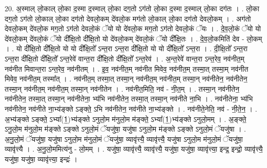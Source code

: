 \documentclass[17pt]{extarticle}
\begin{document}
20. अ॒स्माल् लो॒काल् लो॒का द॒स्मा द॒स्माल् लो॒का दग॒तो ऽग॑तो लो॒का द॒स्मा द॒स्माल् लो॒का दग॑तः । . लो॒का दग॒तो ऽग॑तो लो॒काल् लो॒का दग॑तो देवलो॒कम् दे॑वलो॒क मग॑तो लो॒काल् लो॒का दग॑तो देवलो॒कम् । . अग॑तो देवलो॒कम् दे॑वलो॒क मग॒तो ऽग॑तो देवलो॒कं ॅयो यो दे॑वलो॒क मग॒तो ऽग॑तो देवलो॒कं ॅयः । . दे॒व॒लो॒कं ॅयो यो दे॑वलो॒कम् दे॑वलो॒कं ॅयो दी᳚क्षि॒तो दी᳚क्षि॒तो यो दे॑वलो॒कम् दे॑वलो॒कं ॅयो दी᳚क्षि॒तः । . दे॒व॒लो॒कमिति॑ देव - लो॒कम् । . यो दी᳚क्षि॒तो दी᳚क्षि॒तो यो यो दी᳚क्षि॒तो᳚ ऽन्त॒रा ऽन्त॒रा दी᳚क्षि॒तो यो यो दी᳚क्षि॒तो᳚ ऽन्त॒रा । . दी॒क्षि॒तो᳚ ऽन्त॒रा ऽन्त॒रा दी᳚क्षि॒तो दी᳚क्षि॒तो᳚ ऽन्त॒रेवे॑ वान्त॒रा दी᳚क्षि॒तो दी᳚क्षि॒तो᳚ ऽन्त॒रेव॑ । . अ॒न्त॒रेवे॑ वान्त॒रा ऽन्त॒रेव॒ नव॑नीत॒म् नव॑नीत मिवान्त॒रा ऽन्त॒रेव॒ नव॑नीतम् । . इ॒व॒ नव॑नीत॒म् नव॑नीत मिवेव॒ नव॑नीत॒म् तस्मा॒त् तस्मा॒म् नव॑नीत मिवेव॒ नव॑नीत॒म् तस्मा᳚त् । . नव॑नीत॒म् तस्मा॒त् तस्मा॒न् नव॑नीत॒म् नव॑नीत॒म् तस्मा॒न् नव॑नीतेन॒ नव॑नीतेन॒ तस्मा॒न् नव॑नीत॒म् नव॑नीत॒म् तस्मा॒न् नव॑नीतेन । . नव॑नीत॒मिति॒ नव॑ - नी॒त॒म् । . तस्मा॒न् नव॑नीतेन॒ नव॑नीतेन॒ तस्मा॒त् तस्मा॒न् नव॑नीतेना॒ भ्य॑भि नव॑नीतेन॒ तस्मा॒त् तस्मा॒न् नव॑नीते ना॒भि । . नव॑नीतेना॒ भ्य॑भि नव॑नीतेन॒ नव॑नीते ना॒भ्य॑ङ्क्ते ऽङ्क्ते॒ ऽभि नव॑नीतेन॒ नव॑नीते ना॒भ्य॑ङ्क्ते । . नव॑नीते॒नेति॒ नव॑ - नी॒ते॒न॒ । . अ॒भ्य॑ङ्क्ते ऽङ्क्ते॒ ऽभ्या᳚(1॒)भ्य॑ङ्क्ते ऽनुलो॒म म॑नुलो॒म म॑ङ्क्ते॒ ऽभ्या᳚(1॒)भ्य॑ङ्क्ते ऽनुलो॒मम् । . अ॒ङ्क्ते॒ ऽनु॒लो॒म म॑नुलो॒म म॑ङ्क्ते ऽङ्क्ते ऽनुलो॒मं ॅयजु॑षा॒ यजु॑षा ऽनुलो॒म म॑ङ्क्ते ऽङ्क्ते ऽनुलो॒मं ॅयजु॑षा । . अ॒नु॒लो॒मं ॅयजु॑षा॒ यजु॑षा ऽनुलो॒म म॑नुलो॒मं ॅयजु॑षा॒ व्यावृ॑त्त्यै॒ व्यावृ॑त्त्यै॒ यजु॑षा ऽनुलो॒म म॑नुलो॒मं ॅयजु॑षा॒ व्यावृ॑त्त्यै । . अ॒नु॒लो॒ममित्य॑नु - लो॒मम् । . यजु॑षा॒ व्यावृ॑त्त्यै॒ व्यावृ॑त्त्यै॒ यजु॑षा॒ यजु॑षा॒ व्यावृ॑त्त्या॒ इन्द्र॒ इन्द्रो॒ व्यावृ॑त्त्यै॒ यजु॑षा॒ यजु॑षा॒ व्यावृ॑त्त्या॒ इन्द्रः॑ । \newline
\end{document}
